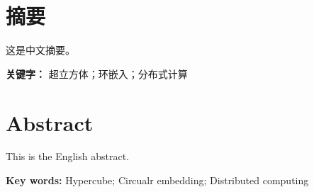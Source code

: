 
\chapter*{摘要}

这是中文摘要。
\hfill\break

\textbf{关键字：} 超立方体；环嵌入；分布式计算

\chapter*{Abstract}

This is the English abstract.
\hfill\break

\textbf{Key words:} Hypercube; Circualr embedding; Distributed computing
